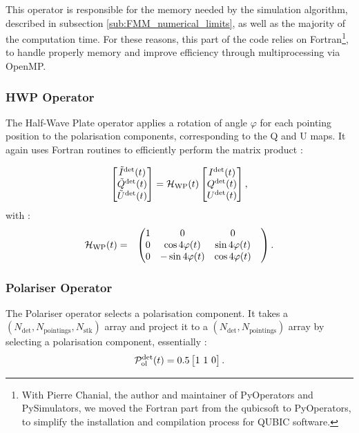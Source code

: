 \documentclass[../../thesis.tex]{subfiles}
\begin{document}
This operator is responsible for the memory needed by the simulation algorithm, described in subsection \ref{sub:FMM_numerical_limits}, as well as the majority of the computation time. For these reasons, this part of the code relies on Fortran\footnote{With Pierre Chanial, the author and maintainer of PyOperators and PySimulators, we moved the Fortran part from the qubicsoft to PyOperators, to simplify the installation and compilation process for QUBIC software.}, to handle properly memory and improve efficiency through multiprocessing via OpenMP.

\subsubsection{HWP Operator}

The Half-Wave Plate operator applies a rotation of angle $\varphi$ for each pointing position to the polarisation components, corresponding to the Q and U maps. It again uses Fortran routines to efficiently perform the matrix product : 

\begin{eqnarray}
  \begin{bmatrix}  \tilde{I}^{\rm det}(t) \\ \tilde{Q}^{\rm det}(t) \\ \tilde{U}^{\rm det}(t) \end{bmatrix}=  {\cal H}_{\rm WP}(t) \begin{bmatrix}  I^{\rm det}(t) \\ Q^{\rm det}(t) \\ U^{\rm det}(t) \end{bmatrix},
\end{eqnarray}
  with :
\begin{eqnarray}
  {\cal H}_{\rm WP}(t) &=&
  \begin{pmatrix} 
    1 & 
    0 & 
    0 & 
    \cr
    0 & 
    \cos 4\varphi(t)& 
    \sin 4\varphi(t)& 
      \cr
    0 & 
    -\sin 4\varphi(t) & 
    \cos 4\varphi(t)& 
    \cr
  \end{pmatrix}.
\end{eqnarray}

\subsubsection{Polariser Operator}

The Polariser operator selects a polarisation component. It takes a $(N_{\text{det}}, N_{\text{pointings}}, N_{\text{stk}})$ array and project it to a $(N_\text{det}, N_{\text{pointings}})$ array by selecting a polarisation component, essentially :
\begin{eqnarray}
  {\cal P}^{\rm det}_{\rm ol} (t)= 0.5 \begin{bmatrix} 1 \ 1 \ 0 \end{bmatrix}.
\end{eqnarray}
\end{document}
